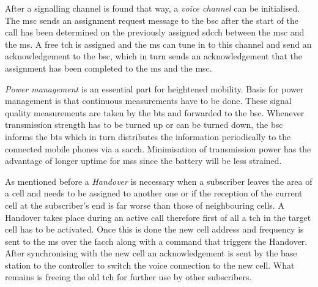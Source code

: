 After a signalling channel is found that way, a \emph{voice channel} can be initialised.
The \gls{msc} sends an assignment request message to the \gls{bsc} after the start of the call has been determined on the previously assigned \gls{sdcch} between the \gls{msc} and the \gls{ms}.
A free \gls{tch} is assigned and the \gls{ms} can tune in to this channel and send an acknowledgement to the \gls{bsc}, which in turn sends an acknowledgement that the assignment has been completed to the \gls{ms} and the \gls{msc}.

\emph{Power management} is an essential part for heightened mobility.
Basis for power management is that continuous measurements have to be done.
These signal quality measurements are taken by the \gls{bts} and forwarded to the \gls{bsc}.
Whenever transmission strength has to be turned up or can be turned down, the \gls{bsc} informs the \gls{bts} which in turn distributes the information periodically to the connected mobile phones via a \gls{sacch}.
Minimisation of transmission power has the advantage of longer uptime for \glspl{ms} since the battery will be less strained.

As mentioned before a \emph{Handover} is necessary when a subscriber leaves the area of a cell and needs to be assigned to another one or if the reception of the current cell at the subscriber's end is far worse than those of neighbouring cells.
A Handover takes place during an active call therefore first of all a \gls{tch} in the target cell has to be activated.
Once this is done the new cell address and frequency is sent to the \gls{ms} over the \gls{facch} along with a command that triggers the Handover.
After synchronising with the new cell an acknowledgement is sent by the base station to the controller to switch the voice connection to the new cell.
What remains is freeing the old \gls{tch} for further use by other subscribers.

